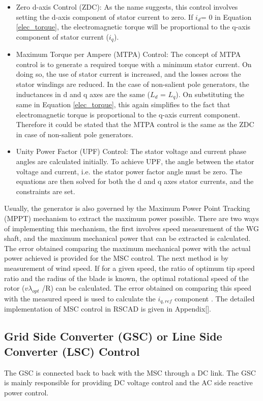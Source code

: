 \begin{itemize}
    \item Zero d-axis Control (ZDC): As the name suggests, this control involves setting the d-axis component of stator current to zero. If $i_d$= 0 in Equation \ref{elec_torque}, the electromagnetic torque will be proportional to the q-axis component of stator current ($i_q$).  
    \item Maximum Torque per Ampere (MTPA) Control: The concept of MTPA control is to generate a required torque with a minimum stator current. On doing so, the use of stator current is increased, and the losses across the stator windings are reduced. In the case of non-salient pole generators, the inductances in d and q axes are the same ($L_d$ = $L_q$). On substituting the same in Equation \ref{elec_torque}, this again simplifies to the fact that electromagnetic torque is proportional to the q-axis current component. Therefore it could be stated that the MTPA control is the same as the ZDC in case of non-salient pole generators. 
    \item Unity Power Factor (UPF) Control: The stator voltage and current phase angles are calculated initially. To achieve UPF, the angle between the stator voltage and current, i.e. the stator power factor angle must be zero. The equations are then solved for both the d and q axes stator currents, and the constraints are set. 
\end{itemize}

Usually, the generator is also governed by the Maximum Power Point Tracking (\gls{MPPT}) mechanism to extract the maximum power possible. There are two ways of implementing this mechanism, the first involves speed measurement of the \gls{WG} shaft, and the maximum mechanical power that can be extracted is calculated. The error obtained comparing the maximum mechanical power with the actual power achieved is provided for the \gls{MSC} control. The next method is by measurement of wind speed. If for a given speed, the ratio of optimum tip speed ratio and the radius of the blade is known, the optimal rotational speed of the rotor ($v\lambda_{opt}$ /R) can be calculated. The error obtained on comparing this speed with the measured speed is used to calculate the $i_{q,ref}$ component \cite{ali_wind_2012}. The detailed implementation of \gls{MSC} control in RSCAD is given in Appendix[].  

\subsection{Grid Side Converter (GSC) or Line Side Converter (LSC) Control}
The \gls{GSC} is connected back to back with the \gls{MSC} through a \gls{DC} link. The \gls{GSC} is mainly responsible for providing \gls{DC} voltage control and the \gls{AC} side reactive power control. 

